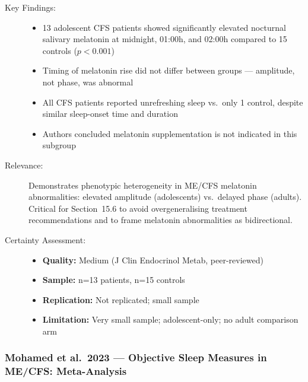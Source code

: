 \begin{description}
    \item[Key Findings:]
    \begin{itemize}
        \item 13 adolescent CFS patients showed significantly elevated nocturnal salivary melatonin at midnight, 01:00h, and 02:00h compared to 15 controls ($p < 0.001$)
        \item Timing of melatonin rise did not differ between groups --- amplitude, not phase, was abnormal
        \item All CFS patients reported unrefreshing sleep vs.\ only 1 control, despite similar sleep-onset time and duration
        \item Authors concluded melatonin supplementation is not indicated in this subgroup
    \end{itemize}
    \item[Relevance:] Demonstrates phenotypic heterogeneity in ME/CFS melatonin abnormalities: elevated amplitude (adolescents) vs.\ delayed phase (adults). Critical for Section~15.6 to avoid overgeneralising treatment recommendations and to frame melatonin abnormalities as bidirectional.
    \item[Certainty Assessment:]
    \begin{itemize}
        \item \textbf{Quality:} Medium (J Clin Endocrinol Metab, peer-reviewed)
        \item \textbf{Sample:} n=13 patients, n=15 controls
        \item \textbf{Replication:} Not replicated; small sample
        \item \textbf{Limitation:} Very small sample; adolescent-only; no adult comparison arm
    \end{itemize}
\end{description}

\subsubsection*{Mohamed et al.\ 2023 --- Objective Sleep Measures in ME/CFS: Meta-Analysis}


